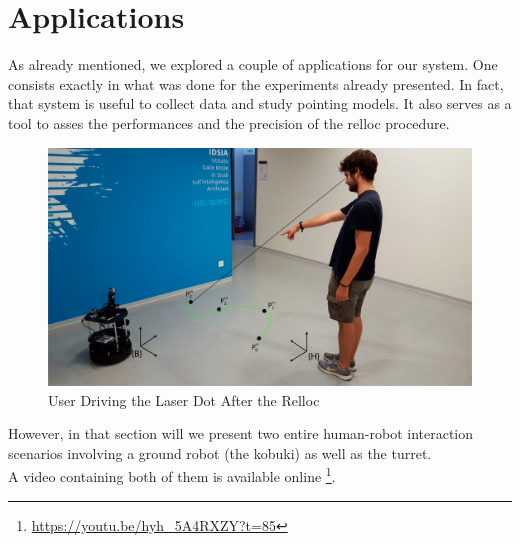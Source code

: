 \section{Applications}
As already mentioned, we explored a couple of applications for our system. One consists exactly in what was done for the experiments already presented. In fact, that system is useful to collect data and study pointing models. It also serves as a tool to asses the performances and the precision of the relloc procedure.\\
\begin{figure}
	\centering
	\includegraphics[width=\textwidth]{img/rellocDemo.png}%
	\caption{User Driving the Laser Dot After the Relloc}
	\label{fig:rellocDemoPhoto}
\end{figure}
However, in that section will we present two entire human-robot interaction scenarios involving a ground robot (the kobuki) as well as the turret.\\
A video containing both of them is available online \footnote{\url{https://youtu.be/hyh_5A4RXZY?t=85}}.

